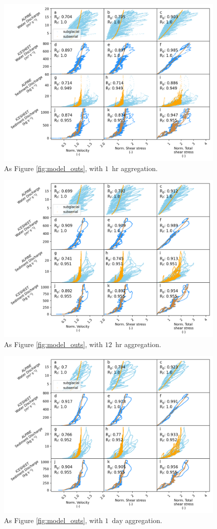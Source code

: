 \documentclass[11pt]{article}
\newcommand{\unit}[1]{$\mathrm{#1}$}
\begin{document}
\renewcommand{\figurename}{Figure S}
\setcounter{figure}{0}
\begin{center}
  \begin{figure}[h]
    \includegraphics[width=0.7\linewidth]{Fig2_hr.png}
    \caption{As Figure \ref{fig:model_outs}, with $1$ \,\unit{hr} aggregation.} 
    \label{fig:model_outs_1hr}
  \end{figure}
\end{center}

\begin{center}
  \begin{figure}[h]
    \includegraphics[width=0.7\linewidth]{Fig2_12hr.png}
    \caption{As Figure \ref{fig:model_outs}, with $12$ \,\unit{hr} aggregation.} 
    \label{fig:model_outs_12hr}
  \end{figure}
\end{center}


\begin{center}
  \begin{figure}[h]
    \includegraphics[width=0.7\linewidth]{Fig2_1day.png}
    \caption{As Figure \ref{fig:model_outs}, with $1$ \,\unit{day} aggregation.} 
    \label{fig:model_outs_1day}
  \end{figure}
\end{center}
\end{document}
